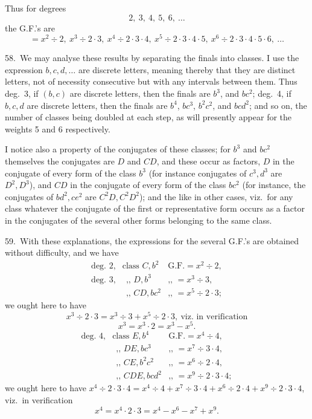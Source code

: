 \documentclass[11pt]{article}
\begin{document}
\clearpage
Thus for degrees
\[
2,\ 3,\ 4,\ 5,\ 6,\ \ldots
\]
the G.F.'s are
\[
= x^2 \div 2,\ x^3 \div 2 \cdot 3,\ x^4 \div 2 \cdot 3 \cdot 4,\ x^5 \div 2 \cdot 3 \cdot 4 \cdot 5,\ x^6 \div 2 \cdot 3 \cdot 4 \cdot 5 \cdot 6,\ \ldots
\]

58.\ We may analyse these results by separating the finals into classes. I use the expression $b, c, d, \ldots$ are discrete letters, meaning thereby that they are distinct letters, not of necessity consecutive but with any intervals between them. Thus deg.\ 3, if $(b, c)$ are discrete letters, then the finals are $b^3$, and $bc^2$; deg.\ 4, if $b, c, d$ are discrete letters, then the finals are $b^4$, $bc^3$, $b^2c^2$, and $bcd^2$; and so on, the number of classes being doubled at each step, as will presently appear for the weights 5 and 6 respectively.

I notice also a property of the conjugates of these classes; for $b^3$ and $bc^2$ themselves the conjugates are $D$ and $CD$, and these occur as factors, $D$ in the conjugate of every form of the class $b^3$ (for instance conjugates of $c^3, d^3$ are $D^2, D^3$), and $CD$ in the conjugate of every form of the class $bc^2$ (for instance, the conjugates of $bd^2, ce^2$ are $C^2D, C^2D^2$); and the like in other cases, viz.\ for any class whatever the conjugate of the first or representative form occurs as a factor in the conjugates of the several other forms belonging to the same class.

59.\ With these explanations, the expressions for the several G.F.'s are obtained without difficulty, and we have
\[
\begin{array}{lll}
\text{deg.\ 2,} & \text{class } C, b^2 & \text{G.F.}= x^2 \div 2, \\
\text{deg.\ 3,} & \text{$\ \ $,, } D, b^3 & \text{,, } = x^3 \div 3, \\
                & \text{$\ \ $,, } CD, bc^2 & \text{,, } = x^5 \div 2 \cdot 3;
\end{array}
\]
we ought here to have
\[
x^3 \div 2 \cdot 3 = x^3 \div 3 + x^5 \div 2 \cdot 3,\ \text{viz.\ in verification}
\]
\[
x^3 = x^3 \cdot 2 = x^3 - x^5.
\]
\[
\begin{array}{lll}
\text{deg.\ 4,} & \text{class } E, b^4 & \text{G.F.}= x^4 \div 4, \\
                & \text{$\ \ $,, } DE, bc^3 & \text{,, } = x^7 \div 3 \cdot 4, \\
                & \text{$\ \ $,, } CE, b^2c^2 & \text{,, } = x^6 \div 2 \cdot 4, \\
                & \text{$\ \ $,, } CDE, bcd^2 & \text{,, } = x^9 \div 2 \cdot 3 \cdot 4;
\end{array}
\]
we ought here to have $x^4 \div 2 \cdot 3 \cdot 4 = x^4 \div 4 + x^7 \div 3 \cdot 4 + x^6 \div 2 \cdot 4 + x^9 \div 2 \cdot 3 \cdot 4$, viz.\ in verification
\[
x^4 = x^4 \cdot 2 \cdot 3 = x^4 - x^6 - x^7 + x^9.
\]
\end{document}
